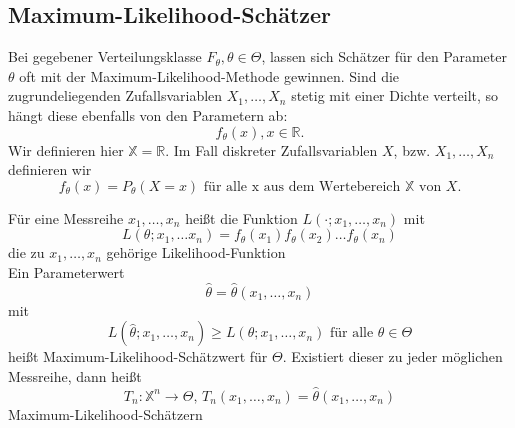\documentclass[
	ngerman,
	accentcolor=9c,%
	type=intern,
	marginpar=false
	]{tudapub}
\begin{document}
        \subsection{Maximum-Likelihood-Schätzer}
            Bei gegebener Verteilungsklasse $F_\theta, \theta \in \Theta$,
            lassen sich Schätzer für den Parameter $\theta$ oft mit der Maximum-Likelihood-Methode gewinnen.
            Sind die zugrundeliegenden Zufallsvariablen $X_1,\dots , X_n$ stetig mit einer Dichte verteilt, so
            hängt diese ebenfalls von den Parametern ab:
            \begin{equation*}
                f_\theta(x), x \in \mathbb{R}.
            \end{equation*}
            Wir definieren hier $\mathbb{X} = \mathbb{R}$.
            Im Fall diskreter Zufallsvariablen $X$, bzw. $X_1,\dots, X_n$ definieren wir
            \begin{equation*}
                f_\theta(x) = P_\theta(X = x) \text{ für alle x aus dem Wertebereich } \mathbb{X} \text{ von } X.
            \end{equation*}
            \begin{definition}
                Für eine Messreihe $x_1, \dots, x_n$ heißt die Funktion $L(\cdot;x_1,\dots,x_n)$ mit 
                \begin{equation*}
                    L(\theta; x_1, \dots x_n) = f_\theta(x_1)f_\theta(x_2)\dots f_\theta(x_n)
                \end{equation*}
                die zu $x_1, \dots, x_n$ gehörige Likelihood-Funktion\\

                Ein Parameterwert
                \begin{equation*}
                    \hat{\theta} = \hat{\theta}(x_1, \dots, x_n) 
                \end{equation*}
                mit 
                \begin{equation*}
                    L(\hat{\theta}; x_1,\dots,x_n) \geq L(\theta; x_1,\dots,x_n) \text{ für alle }\theta \in \Theta
                \end{equation*}
                heißt Maximum-Likelihood-Schätzwert für $\Theta$. Existiert dieser zu jeder möglichen Messreihe, dann heißt
                \begin{equation*}
                    T_n:\mathbb{X}^n\rightarrow \Theta \mbox{, }T_n(x_1,\dots,x_n) = \hat{\theta}(x_1, \dots, x_n)
                \end{equation*}
                Maximum-Likelihood-Schätzern
            \end{definition}
\end{document}
